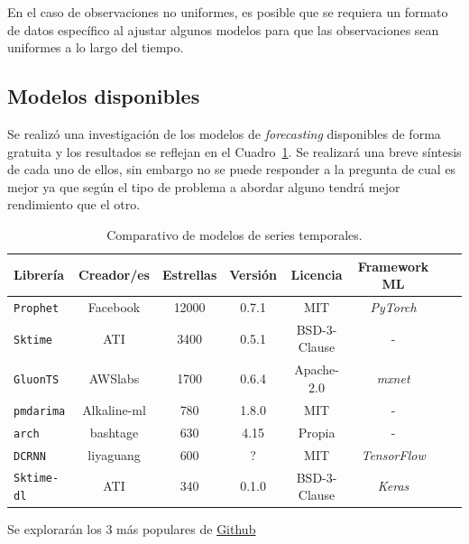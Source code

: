 \documentclass[a4paper,12pt]{article}
\begin{document}
En el caso de observaciones no uniformes, es posible que se requiera un formato de datos específico al ajustar algunos modelos para que las observaciones sean uniformes a lo largo del tiempo.

\subsection{Modelos disponibles}

Se realizó una investigación de los modelos de \textit{forecasting} disponibles de forma gratuita y los resultados se reflejan en el Cuadro~\ref{tab:ts-models}. Se realizará una breve síntesis de cada uno de ellos, sin embargo no se puede responder a la pregunta de cual es mejor ya que según el tipo de problema a abordar alguno tendrá mejor rendimiento que el otro.

\begin{table}[H]
\centering
\begin{tabular}{l|ccccccc}
\textbf{Librería} & \textbf{Creador/es}   & \textbf{Estrellas} & Versión     & Licencia     & Framework ML \\ \hline
\texttt{Prophet}          & Facebook                      & 12000              & 0.7.1          & MIT          & \textit{PyTorch}      \\
\texttt{Sktime}           & ATI  & 3400               & 0.5.1          & BSD-3-Clause & -            \\
\texttt{GluonTS}          & AWSlabs                           & 1700               & 0.6.4        & Apache-2.0   & \textit{mxnet}        \\
\texttt{pmdarima}         & Alkaline-ml                          & 780                & 1.8.0          & MIT          & -            \\
\texttt{arch}             & bashtage                                    & 630                & 4.15           & Propia       & -            \\
\texttt{DCRNN}            & liyaguang                                  & 600          &  ?                    & MIT          & \textit{TensorFlow}   \\
\texttt{Sktime-dl}        & ATI                    & 340                & 0.1.0   & BSD-3-Clause & \textit{Keras}       
\end{tabular}
\caption{Comparativo de modelos de series temporales.}
\label{tab:ts-models}
\end{table}

Se explorarán los 3 más populares de \href{http://www.github.com}{Github} 
\end{document}
